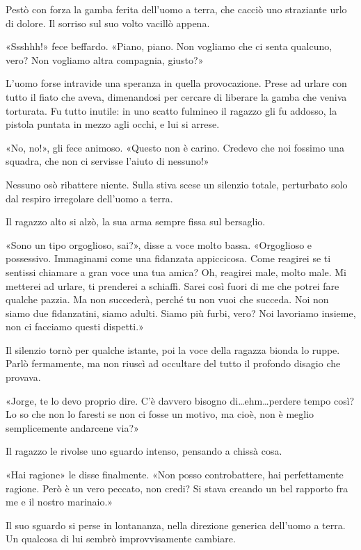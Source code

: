 Pestò con forza la gamba ferita dell'uomo a terra, che cacciò uno straziante urlo di dolore. Il sorriso sul suo volto vacillò appena.

«Ssshhh!» fece beffardo. «Piano, piano. Non vogliamo che ci senta qualcuno, vero? Non vogliamo altra compagnia, giusto?»

L'uomo forse intravide una speranza in quella provocazione. Prese ad urlare con tutto il fiato che aveva, dimenandosi per cercare di liberare la gamba che veniva torturata. Fu tutto inutile: in uno scatto fulmineo il ragazzo gli fu addosso, la pistola puntata in mezzo agli occhi, e lui si arrese.

«No, no!», gli fece animoso. «Questo non è carino. Credevo che noi fossimo una squadra, che non ci servisse l'aiuto di nessuno!»

Nessuno osò ribattere niente. Sulla stiva scese un silenzio totale, perturbato solo dal respiro irregolare dell'uomo a terra.

Il ragazzo alto si alzò, la sua arma sempre fissa sul bersaglio.

«Sono un tipo orgoglioso, sai?», disse a voce molto bassa. «Orgoglioso e possessivo. Immaginami come una fidanzata appiccicosa. Come reagirei se ti sentissi chiamare a gran voce una tua amica? Oh, reagirei male, molto male. Mi metterei ad urlare, ti prenderei a schiaffi. Sarei così fuori di me che potrei fare qualche pazzia. Ma non succederà, perché tu non vuoi che succeda. Noi non siamo due fidanzatini, siamo adulti. Siamo più furbi, vero? Noi lavoriamo insieme, non ci facciamo questi dispetti.»

Il silenzio tornò per qualche istante, poi la voce della ragazza bionda lo ruppe. Parlò fermamente, ma non riuscì ad occultare del tutto il profondo disagio che provava.

«Jorge, te lo devo proprio dire. C'è davvero bisogno di\ldots ehm\ldots perdere tempo così? Lo so che non lo faresti se non ci fosse un motivo, ma cioè, non è meglio semplicemente andarcene via?»

Il ragazzo le rivolse uno sguardo intenso, pensando a chissà cosa.

«Hai ragione» le disse finalmente. «Non posso controbattere, hai perfettamente ragione. Però è un vero peccato, non credi? Si stava creando un bel rapporto fra me e il nostro marinaio.»

Il suo sguardo si perse in lontananza, nella direzione generica dell'uomo a terra. Un qualcosa di lui sembrò improvvisamente cambiare.

